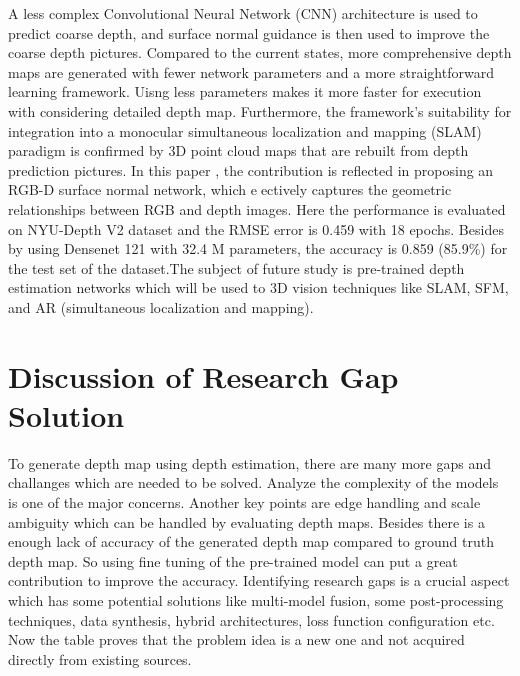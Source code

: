 \documentclass[a4paper,12pt,oneside]{book}
\begin{document}
A less complex Convolutional Neural Network (CNN) architecture is used to predict coarse depth, and surface normal guidance is then used to improve the coarse depth pictures.
Compared to the current states, more comprehensive depth maps are generated with fewer network parameters and a more straightforward learning framework. Uisng less parameters makes it more faster for execution with considering detailed depth map. Furthermore, the framework's suitability for integration into a monocular simultaneous localization and mapping (SLAM) paradigm is confirmed by 3D point cloud maps that are rebuilt from depth prediction pictures.
In this paper \cite{article_sf}, the contribution is reflected in proposing an RGB-D surface normal network, which eectively captures the geometric relationships between RGB and depth images. Here the performance is evaluated on NYU-Depth V2 dataset and the RMSE error is 0.459 with 18 epochs. Besides by using Densenet 121 with 32.4 M parameters, the accuracy is 0.859 (85.9\%) for the test set of the dataset.The subject of future study is pre-trained depth estimation networks which will be used to 3D vision techniques like SLAM, SFM, and AR (simultaneous localization and mapping). 
\section{Discussion of Research Gap Solution }
To generate depth map using depth estimation, there are many more gaps and challanges which are needed to be solved. Analyze the complexity of the models is one of the major concerns. Another key points are edge handling and scale ambiguity which can be handled by evaluating depth maps. Besides there is a enough lack of accuracy of the generated depth map compared to ground truth depth map. So using fine tuning of the pre-trained model can put a great contribution to improve the accuracy.
Identifying research gaps is a crucial aspect which has some potential solutions like multi-model fusion, some post-processing techniques, data synthesis, hybrid architectures, loss function configuration etc. Now the table proves that the problem idea is a new one and not acquired directly from existing sources.
\end{document}
